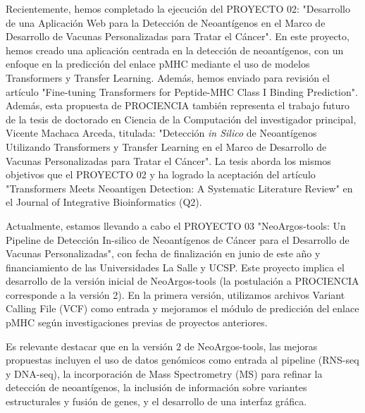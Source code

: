 \documentclass[a4paper,11pt]{article}
\begin{document}
Recientemente, hemos completado la ejecución del PROYECTO 02: "Desarrollo de una Aplicación Web para la Detección de Neoantígenos en el Marco de Desarrollo de Vacunas Personalizadas para Tratar el Cáncer". En este proyecto, hemos creado una aplicación centrada en la detección de neoantígenos, con un enfoque en la predicción del enlace pMHC mediante el uso de modelos Transformers y Transfer Learning. Además, hemos enviado para revisión el artículo "Fine-tuning Transformers for Peptide-MHC Class I Binding Prediction". Además, esta propuesta de PROCIENCIA también representa el trabajo futuro de la tesis de doctorado en Ciencia de la Computación del investigador principal, Vicente Machaca Arceda, titulada: "Detección \textit{in Silico} de Neoantígenos Utilizando Transformers y Transfer Learning en el Marco de Desarrollo de Vacunas Personalizadas para Tratar el Cáncer". La tesis aborda los mismos objetivos que el PROYECTO 02 y ha logrado la aceptación del artículo "Transformers Meets Neoantigen Detection: A Systematic Literature Review" en el Journal of Integrative Bioinformatics (Q2).

Actualmente, estamos llevando a cabo el PROYECTO 03 "NeoArgos-tools: Un Pipeline de Detección In-silico de Neoantígenos de Cáncer para el Desarrollo de Vacunas Personalizadas", con fecha de finalización en junio de este año y financiamiento de las Universidades La Salle y UCSP. Este proyecto implica el desarrollo de la versión inicial de NeoArgos-tools (la postulación a PROCIENCIA corresponde a la versión 2). En la primera versión, utilizamos archivos Variant Calling File (VCF) como entrada y mejoramos el módulo de predicción del enlace pMHC según investigaciones previas de proyectos anteriores.

Es relevante destacar que en la versión 2 de NeoArgos-tools, las mejoras propuestas incluyen el uso de datos genómicos como entrada al pipeline (RNS-seq y DNA-seq), la incorporación de Mass Spectrometry (MS) para refinar la detección de neoantígenos, la inclusión de información sobre variantes estructurales y fusión de genes, y el desarrollo de una interfaz gráfica.
\end{document}
